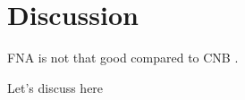 \chapter{Discussion}

FNA is not that good compared to CNB \parencite{Topps2018}.

Let's discuss here
